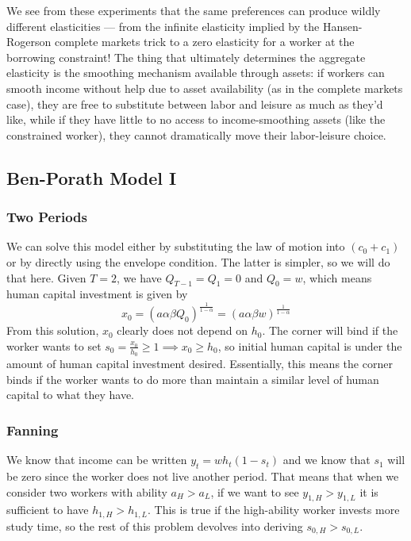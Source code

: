 \documentclass[12pt, letterpaper, parskip = full]{article}
\begin{document}
    We see from these experiments that the same preferences can produce wildly different elasticities --- from the infinite elasticity implied by the Hansen-Rogerson complete markets trick to a zero elasticity for a worker at the borrowing constraint! The thing that ultimately determines the aggregate elasticity is the smoothing mechanism available through assets: if workers can smooth income without help due to asset availability (as in the complete markets case), they are free to substitute between labor and leisure as much as they'd like, while if they have little to no access to income-smoothing assets (like the constrained worker), they cannot dramatically move their labor-leisure choice. 

    \subsection{Ben-Porath Model I}

    \subsubsection{Two Periods}

    We can solve this model either by substituting the law of motion into \((c_0 + c_1)\) or by directly using the envelope condition. The latter is simpler, so we will do that here. Given \(T = 2\), we have \(Q_{T - 1} = Q_1 = 0\) and \(Q_0 = w\), which means human capital investment is given by
    \[ x_0 = (a \alpha \beta Q_0)^{\frac{1}{1 - \alpha}} = (a \alpha \beta w)^{\frac{1}{1-\alpha}}   \]
    From this solution, \(x_0\) clearly does not depend on \(h_0\). The corner will bind if the worker wants to set \( s_0 = \frac{x_0}{h_0} \geq 1 \implies x_0 \geq h_0\), so initial human capital is under the amount of human capital investment desired. Essentially, this means the corner binds if the worker wants to do more than maintain a similar level of human capital to what they have.

    \subsubsection{Fanning}

    We know that income can be written \(y_t = w h_t (1 - s_t)\) and we know that \(s_1\) will be zero since the worker does not live another period. That means that when we consider two workers with ability \(a_H > a_L\), if we want to see \(y_{1,H} > y_{1,L}\) it is sufficient to have \(h_{1,H} > h_{1,L}\). This is true if the high-ability worker invests more study time, so the rest of this problem devolves into deriving \(s_{0,H} > s_{0,L}\). 
    
\end{document}
